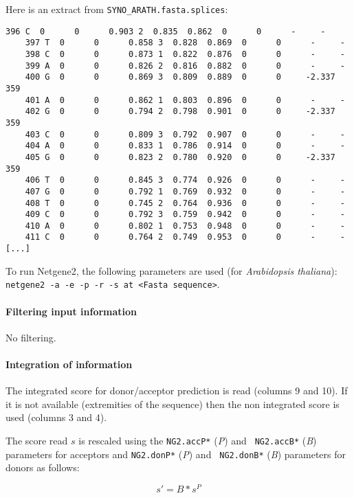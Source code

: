 Here is an extract from \texttt{SYNO\_ARATH.fasta.splices}:
\begin{Verbatim}[fontsize=\small]
    396 C  0      0      0.903 2  0.835  0.862  0      0      -     - 
    397 T  0      0      0.858 3  0.828  0.869  0      0      -     - 
    398 C  0      0      0.873 1  0.822  0.876  0      0      -     - 
    399 A  0      0      0.826 2  0.816  0.882  0      0      -     - 
    400 G  0      0      0.869 3  0.809  0.889  0      0     -2.337 359 
    401 A  0      0      0.862 1  0.803  0.896  0      0      -     - 
    402 G  0      0      0.794 2  0.798  0.901  0      0     -2.337 359 
    403 C  0      0      0.809 3  0.792  0.907  0      0      -     - 
    404 A  0      0      0.833 1  0.786  0.914  0      0      -     - 
    405 G  0      0      0.823 2  0.780  0.920  0      0     -2.337 359 
    406 T  0      0      0.845 3  0.774  0.926  0      0      -     - 
    407 G  0      0      0.792 1  0.769  0.932  0      0      -     - 
    408 T  0      0      0.745 2  0.764  0.936  0      0      -     - 
    409 C  0      0      0.792 3  0.759  0.942  0      0      -     - 
    410 A  0      0      0.802 1  0.753  0.948  0      0      -     - 
    411 C  0      0      0.764 2  0.749  0.953  0      0      -     - 
[...]
\end{Verbatim}

To run Netgene2, the following parameters are used (for \emph{Arabidopsis
thaliana}): \texttt{netgene2 -a -e -p -r -s at <Fasta sequence>}.

\paragraph{Filtering input information}

No filtering.

\paragraph{Integration of information}

The integrated score for donor/acceptor prediction is read (columns 9
and 10). If it is not available (extremities of the sequence) then the
non integrated score is used (columns 3 and 4).

The score read $s$ is rescaled using the {\tt NG2.accP*} (\emph{P}) and {\tt
NG2.accB*} (\emph{B}) parameters for acceptors and {\tt NG2.donP*} (\emph{P}) and {\tt
NG2.donB*} (\emph{B}) parameters for donors as follows:

\[s' = B*s^P\]

